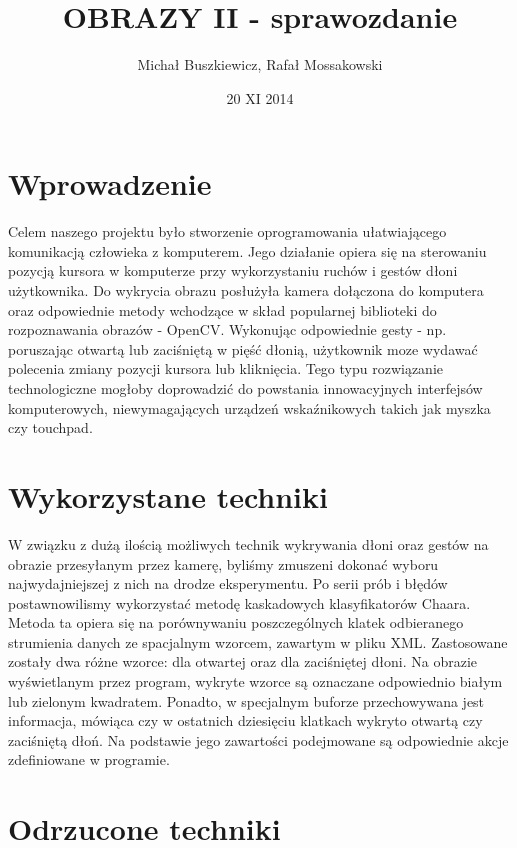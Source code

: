 \documentclass[a4paper,12pt]{article}
\begin{document}
\begin{titlepage}
\title{OBRAZY II - sprawozdanie}
\author{Michał Buszkiewicz, Rafał Mossakowski}
\date{20 XI 2014}
\maketitle
\end{titlepage}

\section{Wprowadzenie}
Celem naszego projektu było stworzenie oprogramowania ułatwiającego komunikacją człowieka z komputerem. Jego działanie opiera się na sterowaniu pozycją kursora w komputerze przy wykorzystaniu ruchów i gestów dłoni użytkownika. Do wykrycia obrazu posłużyła kamera dołączona do komputera oraz odpowiednie metody wchodzące w skład popularnej biblioteki do rozpoznawania obrazów - OpenCV. Wykonując odpowiednie gesty - np. poruszając otwartą lub zaciśniętą w pięść dłonią, użytkownik moze wydawać polecenia zmiany pozycji kursora lub kliknięcia. Tego typu rozwiązanie technologiczne mogłoby doprowadzić do powstania innowacyjnych interfejsów komputerowych, niewymagających urządzeń wskaźnikowych takich jak myszka czy touchpad.

\section{Wykorzystane techniki}
W związku z dużą ilością możliwych technik wykrywania dłoni oraz gestów na obrazie przesyłanym przez kamerę, byliśmy zmuszeni dokonać wyboru najwydajniejszej z nich na drodze eksperymentu. Po serii prób i błędów postawnowilismy wykorzystać metodę kaskadowych klasyfikatorów Chaara. Metoda ta opiera się na porównywaniu poszczególnych klatek odbieranego strumienia danych ze spacjalnym wzorcem, zawartym w pliku XML. Zastosowane zostały dwa różne wzorce: dla otwartej oraz dla zaciśniętej dłoni. Na obrazie wyświetlanym przez program, wykryte wzorce są oznaczane odpowiednio białym lub zielonym kwadratem. Ponadto, w specjalnym buforze przechowywana jest informacja, mówiąca czy w ostatnich dziesięciu klatkach wykryto otwartą czy zaciśniętą dłoń. Na podstawie jego zawartości podejmowane są odpowiednie akcje zdefiniowane w programie.



\section{Odrzucone techniki}
\end{document}
